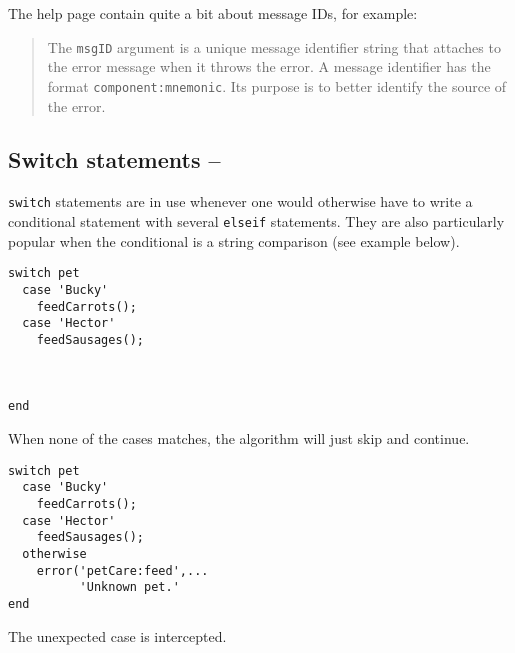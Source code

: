 The \matlab{} help page contain quite a bit about message IDs, for example:
\begin{quotation}
The \lstinline!msgID! argument is a unique message identifier string that \matlab{} attaches to the error message when it throws the error. A message identifier has the format \lstinline!component:mnemonic!. Its purpose is to better identify the source of the error.
\end{quotation}


\subsection{Switch statements -- \cleansymbol\cleansymbol}

\lstinline!switch! statements are in use whenever one would otherwise have to write a conditional statement with several \lstinline!elseif! statements. They are also particularly popular when the conditional is a string comparison (see example below).

\hfill
\begin{minipage}[t]{.45\textwidth}
\begin{lstlisting}[framerule=2pt,rulecolor=\color{badred}]
switch pet
  case 'Bucky'
    feedCarrots();
  case 'Hector'
    feedSausages();



end
\end{lstlisting}
When none of the cases matches, the algorithm will just skip and continue.
\end{minipage}
\hfill
\begin{minipage}[t]{.45\textwidth}
\begin{lstlisting}[framerule=2pt,rulecolor=\color{goodgreen}]
switch pet
  case 'Bucky'
    feedCarrots();
  case 'Hector'
    feedSausages();
  otherwise
    error('petCare:feed',...
          'Unknown pet.'
end
\end{lstlisting}
The unexpected case is intercepted.
\end{minipage}
\hfill



